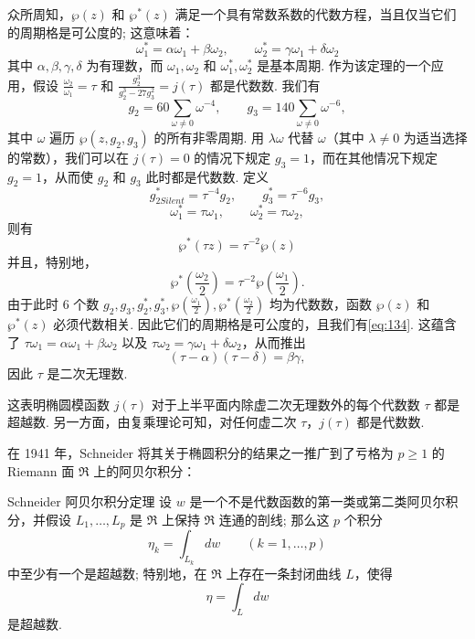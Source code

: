 众所周知，$\wp(z)$ 和 $\wp^*(z)$ 满足一个具有常数系数的代数方程，当且仅当它们的周期格是可公度的; 这意味着：
\begin{equation}
\omega_1^* = \alpha \omega_1 + \beta \omega_2, \qquad \omega_2^* = \gamma \omega_1 + \delta \omega_2 \tag{134}\label{eq:134}
\end{equation}
其中 $\alpha, \beta, \gamma, \delta$ 为有理数，而 $\omega_1, \omega_2$ 和 $\omega_1^*, \omega_2^*$ 是基本周期. 作为该定理的一个应用，假设 $\frac{\omega_2}{\omega_1} = \tau$ 和 $\frac{g_2^3}{g_2^3 - 27g_3^2} = j(\tau)$ 都是代数数. 我们有
\[
g_2 = 60 \sum_{\omega \neq 0} \omega^{-4}, \qquad g_3 = 140 \sum_{\omega \neq 0} \omega^{-6},
\]
其中 $\omega$ 遍历 $\wp(z, g_2, g_3)$ 的所有非零周期. 用 $\lambda\omega$ 代替 $\omega$（其中 $\lambda \neq 0$ 为适当选择的常数），我们可以在 $j(\tau)=0$ 的情况下规定 $g_3=1$，而在其他情况下规定 $g_2=1$，从而使 $g_2$ 和 $g_3$ 此时都是代数数. 定义
\begin{equation}
g_{2Silent}^{*} = \tau^{-4} g_{2}, \qquad g_{3}^{*} = \tau^{-6} g_{3}, \tag{135}\label{eq:135}
\end{equation}
\[
\omega_{1}^{*} = \tau \omega_{1}, \qquad \omega_{2}^{*} = \tau \omega_{2},
\]
则有
\[
\wp^*(\tau z) = \tau^{-2} \wp(z)
\]
并且，特别地，
\[
\wp^*\left(\frac{\omega_2}{2}\right) = \tau^{-2} \wp\left(\frac{\omega_1}{2}\right).
\]
由于此时 6 个数 $g_2, g_3, g_2^*, g_3^*, \wp(\frac{\omega_1}{2}), \wp^*(\frac{\omega_2}{2})$ 均为代数数，函数 $\wp(z)$ 和 $\wp^*(z)$ 必须代数相关. 因此它们的周期格是可公度的，且我们有\eqref{eq:134}. 这蕴含了 $\tau \omega_1 = \alpha \omega_1 + \beta \omega_2$ 以及 $\tau \omega_2 = \gamma \omega_1 + \delta \omega_2$，从而推出
\[
(\tau - \alpha)(\tau - \delta) = \beta \gamma,
\]
因此 $\tau$ 是二次无理数.

这表明椭圆模函数 $j(\tau)$ 对于上半平面内除虚二次无理数外的每个代数数 $\tau$ 都是超越数. 另一方面，由复乘理论可知，对任何虚二次 $\tau$，$j(\tau)$ 都是代数数.

在 1941 年，Schneider 将其关于椭圆积分的结果之一推广到了亏格为 $p \ge 1$ 的 Riemann 面 $\mathfrak{R}$ 上的阿贝尔积分：

\begin{mythm*}{Schneider 阿贝尔积分定理}
设 $w$ 是一个不是代数函数的第一类或第二类阿贝尔积分，并假设 $L_1, \dots, L_p$ 是 $\mathfrak{R}$ 上保持 $\mathfrak{R}$ 连通的剖线; 那么这 $p$ 个积分
\[
\eta_{k} = \int_{L_{k}} dw \qquad (k=1,\dots,p)
\]
中至少有一个是超越数; 特别地，在 $\mathfrak{R}$ 上存在一条封闭曲线 $L$，使得
\begin{equation}
\eta = \int_{L} dw \tag{136}\label{eq:136}
\end{equation}
是超越数.
\end{mythm*}

